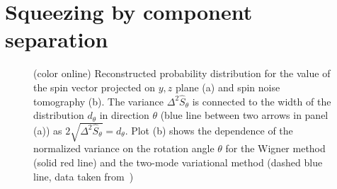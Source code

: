 \section{Squeezing by component separation}


\begin{figure}

    \caption[]{(color online)
    Reconstructed probability distribution for the value of the spin vector projected on $y,z$ plane (a) and spin noise tomography (b).
    The variance $\Delta^2 \hat{S}_\theta$ is connected to the width of the distribution $d_\theta$ in direction $\theta$
    (blue line between two arrows in panel (a)) as
    $2 \sqrt{\Delta^2 \hat{S}_\theta} = d_\theta$.
    Plot (b) shows the dependence of the normalized variance on the rotation angle $\theta$ for
    the Wigner method (solid red line) and the two-mode variational method (dashed blue line, data taken from~\cite{Riedel2010})
    }
    \label{fig:riedel-rotation}
\end{figure}

